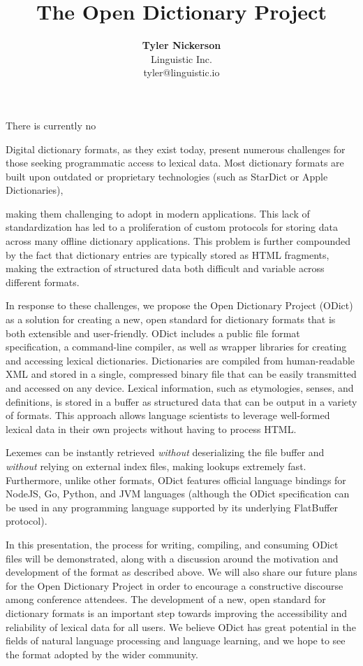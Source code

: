 \documentclass{article}
\begin{document}
\title{\textbf{The Open Dictionary Project}}
\author{\textbf{Tyler Nickerson} \\ \small{Linguistic Inc.} \\ \small{tyler@linguistic.io}}
\date{}
\maketitle
There is currently no 

Digital dictionary formats, as they exist today, present numerous challenges for those seeking programmatic access to lexical data. Most dictionary formats are built upon outdated or proprietary technologies (such as StarDict or Apple Dictionaries), 



making them challenging to adopt in modern applications. This lack of standardization has led to a proliferation of custom protocols for storing data across many offline dictionary applications. This problem is further compounded by the fact that dictionary entries are typically stored as HTML fragments, making the extraction of structured data both difficult and variable across different formats.

In response to these challenges, we propose the Open Dictionary Project (ODict) as a solution for creating a new, open standard for dictionary formats that is both extensible and user-friendly. ODict includes a public file format specification, a command-line compiler, as well as wrapper libraries for creating and accessing lexical dictionaries. Dictionaries are compiled from human-readable XML and stored in a single, compressed binary file that can be easily transmitted and accessed on any device. Lexical information, such as etymologies, senses, and definitions, is stored in a buffer as structured data that can be output in a variety of formats. This approach allows language scientists to leverage well-formed lexical data in their own projects without having to process HTML.

Lexemes can be instantly retrieved \emph{without} deserializing the file buffer and \emph{without} relying on external index files, making lookups extremely fast. Furthermore, unlike other formats, ODict features official language bindings for NodeJS, Go, Python, and JVM languages (although the ODict specification can be used in any programming language supported by its underlying FlatBuffer protocol).

In this presentation, the process for writing, compiling, and consuming ODict files will be demonstrated, along with a discussion around the motivation and development of the format as described above. We will also share our future plans for the Open Dictionary Project in order to encourage a constructive discourse among conference attendees. The development of a new, open standard for dictionary formats is an important step towards improving the accessibility and reliability of lexical data for all users. We believe ODict has great potential in the fields of natural language processing and language learning, and we hope to see the format adopted by the wider community.
\end{document}
